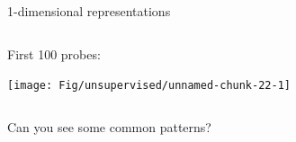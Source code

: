 \documentclass[
  ignorenonframetext,
  aspectratio=169]{beamer}
\begin{document}
\begin{frame}{1-dimensional representations}
\protect\hypertarget{dimensional-representations}{}
\begin{columns}[T]
\begin{column}{.25\textwidth}
First 100 probes:

\scriptsize

\begin{center}\texttt{[image: Fig/unsupervised/unnamed-chunk-22-1]} \end{center}

\normalsize
\end{column}

\begin{column}{.65\textwidth}
\scriptsize


\normalsize

\scriptsize


\normalsize
\end{column}
\end{columns}
\end{frame}

\begin{frame}{Can you see some common patterns?}
\protect\hypertarget{can-you-see-some-common-patterns}{}
\begin{columns}[T]
\begin{column}{.45\textwidth}
\scriptsize


\normalsize
\end{column}

\begin{column}{.45\textwidth}
\scriptsize


\normalsize
\end{column}
\end{columns}
\end{frame}
\end{document}
